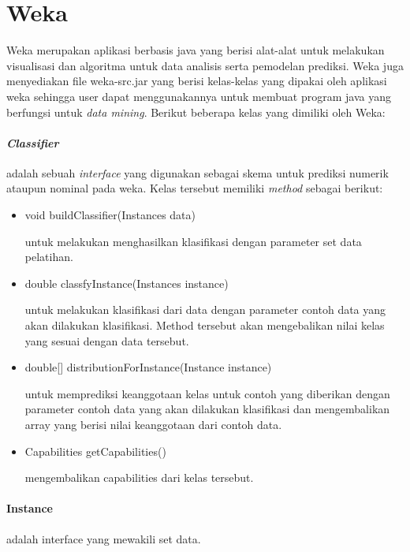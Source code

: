 \section{Weka}\cite{Weka}
Weka merupakan aplikasi berbasis java yang berisi alat-alat untuk melakukan visualisasi dan algoritma untuk data analisis serta pemodelan prediksi. Weka juga menyediakan file weka-src.jar yang berisi kelas-kelas yang dipakai oleh aplikasi weka sehingga user dapat menggunakannya untuk membuat program java yang berfungsi untuk \textsl{data mining}. Berikut beberapa kelas yang dimiliki oleh Weka:

\paragraph{\textsl{Classifier}} adalah sebuah \textsl{interface} yang digunakan sebagai skema untuk prediksi numerik ataupun nominal pada weka. Kelas tersebut memiliki \textsl{method} sebagai berikut:
\begin{itemize}
	
	\item void buildClassifier(Instances data)
	
	untuk melakukan menghasilkan klasifikasi dengan parameter set data pelatihan.
	
	\item double classfyInstance(Instances instance)
	
	untuk melakukan klasifikasi dari data dengan parameter contoh data yang akan dilakukan klasifikasi. Method tersebut akan mengebalikan nilai kelas yang sesuai dengan data tersebut.
	
	\item double[] distributionForInstance(Instance instance)
	
	untuk memprediksi keanggotaan kelas untuk contoh yang diberikan dengan parameter contoh data yang akan dilakukan klasifikasi dan mengembalikan array yang berisi nilai keanggotaan dari contoh data.
	
	\item Capabilities getCapabilities()
	
	mengembalikan capabilities dari kelas tersebut.
\end{itemize}

\paragraph{Instance} adalah interface yang mewakili set data.


